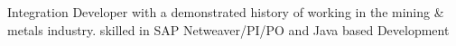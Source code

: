 

\begin{cvparagraph}

Integration Developer with a demonstrated history of working in the mining \& metals industry. skilled in SAP Netweaver/PI/PO and Java based Development
\end{cvparagraph}
